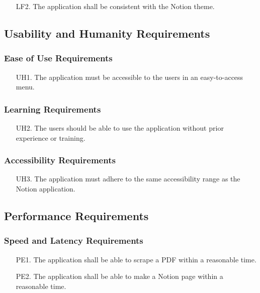 \documentclass[12pt, titlepage]{article}
\begin{document}
\begin{itemize}
  \item[LF2.] The application shall be consistent with the Notion theme. 
\end{itemize}

\subsection{Usability and Humanity Requirements}

\subsubsection{Ease of Use Requirements}

\begin{itemize}
  \item[UH1.] The application must be accessible to the users in an easy-to-access menu.
\end{itemize}

\subsubsection{ Learning Requirements}

\begin{itemize}
  \item[UH2.] The users should be able to use the application without prior experience or training.
\end{itemize}

\subsubsection{Accessibility Requirements}

\begin{itemize}
  \item[UH3.] The application must adhere to the same accessibility range as the Notion application. 
\end{itemize}

\subsection{Performance Requirements}

\subsubsection{Speed and Latency Requirements}

\begin{itemize}
  \item[PE1.] The application shall be able to scrape a PDF within a reasonable time. 
  \item[PE2.] The application shall be able to make a Notion page within a reasonable time. 
\end{itemize}
\end{document}
